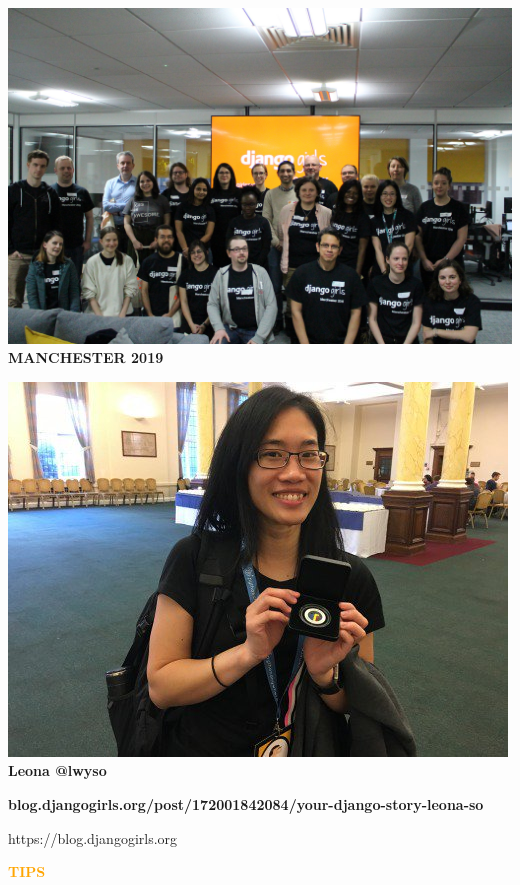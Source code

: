 \documentclass{beamer}
\begin{document}
\begin{frame}
    \begin{center}
        \includegraphics[width=.7\textwidth]{static/mcr_2019} \\
    \textbf{MANCHESTER 2019}
    \end{center}
\end{frame}

\begin{frame}
    \begin{center}
        \includegraphics[width=.7\textwidth]{static/leona} \\
    \textbf{Leona @lwyso}
    \vspace{1cm}

    \scriptsize{\textbf{blog.djangogirls.org/post/172001842084/your-django-story-leona-so}}
    \end{center}
\end{frame}

\begin{frame}
    \begin{center}
    https://blog.djangogirls.org
    \end{center}
\end{frame}

\begin{frame}
    \begin{center}
    \textbf{\textcolor{orange}{TIPS}}
    \end{center}
\end{frame}
\end{document}
